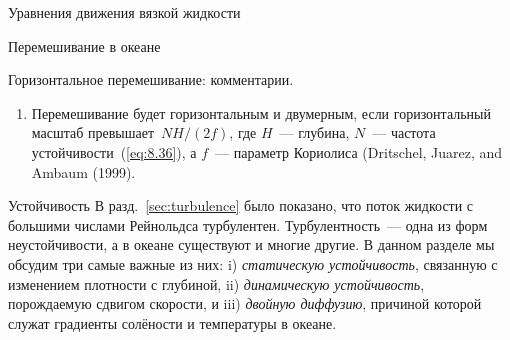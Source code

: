\begin{chapter}{Уравнения движения вязкой жидкости}
\begin{section}{Перемешивание в океане}
\begin{paragraph}{Горизонтальное перемешивание: комментарии.}
\begin{enumerate}
\item
Перемешивание будет горизонтальным и двумерным, если горизонтальный масштаб
превышает~$NH/(2f)$, где $H$~--- глубина, $N$~--- частота 
устойчивости~(\ref{eq:8.36}), 
а $f$~--- параметр Кориолиса (Dritschel, Juarez, and Ambaum (1999).
%
\end{enumerate}
\end{paragraph}
\end{section}

\begin{section}{Устойчивость}\label{sec:Stability}
В разд.~\ref{sec:turbulence} было показано, что поток жидкости с большими
числами Рейнольдса турбулентен. Турбулентность~--- одна из форм 
неустойчивости, а в океане существуют и многие другие. В данном разделе
мы обсудим три самые важные из них: 
i) \emph{статическую устойчивость},
связанную с изменением плотности с глубиной,
ii) \emph{динамическую устойчивость},
порождаемую сдвигом скорости, 
и iii) \emph{двойную диффузию}, причиной которой служат
градиенты солёности и температуры в океане.
%


\end{section}
\end{chapter}
